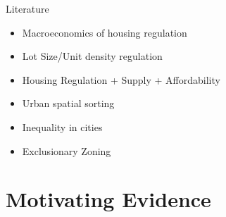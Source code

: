 \documentclass{beamer}
\begin{document}
	\begin{frame}{Literature}
		\fontsize{8pt}{7.2}	
		\begin{itemize}
			\itemsep1em		
			
			\item \color{red} Macroeconomics of housing regulation \citep{hseihmoretti} \citep{durantonpugaurbgrowth} \citep{parkho} \citep{bunten} \citep{hop} \citep{ganongshoag} \citep{superstarcities} 
			
			
			\item \color{red} Lot Size/Unit density regulation \citep{kulka} \citep{Song} \citep{KSC} \citep{zabel} \citep{gyourko2021} \citep{griesonwhite} \citep{gyourkovoith1997} \citep{davidoff2022}
			
			\item \color{red} Housing Regulation + Supply + Affordability \citep{BSH} \citep{saiz2010} \citep{asquithetallocaleffects} \citep{mastwarding} \citep{albouyetal} \citep{bbheight} \citep{mills2005} \citep{bruecknersingh} \citep{BruecknerFuGu} \citep{acosta} \citep{martynov} \citep{turner2014} \citep{gyourkomolloy} \cite{anagoletal2021}
			
			\item \color{purple} Urban spatial sorting \citep{diamond2016} \citep{couturehandbury} \citep{su2021} \citep{bshartley2020} \citep{Coutureetal} \citep{AlmagroDI} \citep{parispoor} \citep{ccpoortransport} \citep{Gentrificationcycles} \cite{LeeandLin}
			
			\item \color{purple} Inequality in cities \citep{ineqcitysize} \citep{spatialsorting} \citep{FogliGuerrieri}
			
			\item \color{teal} Exclusionary Zoning \citep{Hamilton1975} \citep{calabresetal} \citep{keepingpeopleout} \citep{ineffTiebout} \citep{barcoate} \citep{brueckner2021}
		\end{itemize}
	\end{frame}

\section{Motivating Evidence}
\end{document}
